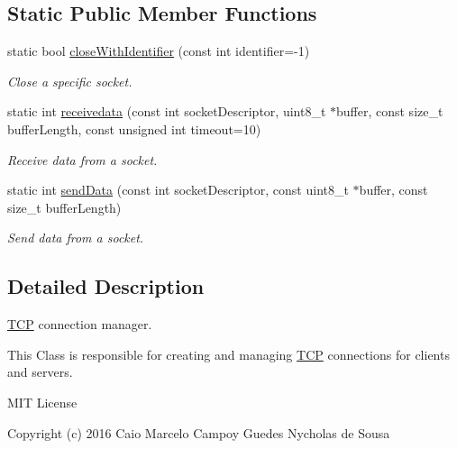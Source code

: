 \subsection*{Static Public Member Functions}
\begin{DoxyCompactItemize}
\item 
static bool \hyperlink{class_t_c_p_a75c116fdc24d803ab7fc3effead0793a}{close\+With\+Identifier} (const int identifier=-\/1)
\begin{DoxyCompactList}\small\item\em Close a specific socket. \end{DoxyCompactList}\item 
static int \hyperlink{class_t_c_p_ae120ce7abfcd5eb5bccec7960e84ea4b}{receivedata} (const int socket\+Descriptor, uint8\+\_\+t $\ast$buffer, const size\+\_\+t buffer\+Length, const unsigned int timeout=10)
\begin{DoxyCompactList}\small\item\em Receive data from a socket. \end{DoxyCompactList}\item 
static int \hyperlink{class_t_c_p_a2508bd0dafeb820da51b07ecdf1627f9}{send\+Data} (const int socket\+Descriptor, const uint8\+\_\+t $\ast$buffer, const size\+\_\+t buffer\+Length)
\begin{DoxyCompactList}\small\item\em Send data from a socket. \end{DoxyCompactList}\end{DoxyCompactItemize}


\subsection{Detailed Description}
\hyperlink{class_t_c_p}{T\+CP} connection manager. 

This Class is responsible for creating and managing \hyperlink{class_t_c_p}{T\+CP} connections for clients and servers.

M\+IT License

Copyright (c) 2016 Caio Marcelo Campoy Guedes Nycholas de Sousa

